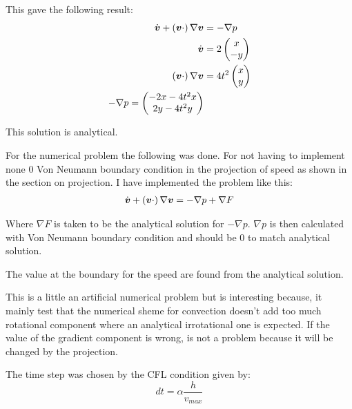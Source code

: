 This gave the following result:
\begin{align}
\dot{{\boldsymbol {v}}}+ \left({\boldsymbol {v}}\cdot\right) \nabla {\boldsymbol {v}}&=-\nabla p\\
\dot{{\boldsymbol {v}}}&=2\begin{pmatrix}
	               	x\\
	               	-y
	               \end{pmatrix}\\
\left({\boldsymbol {v}}\cdot\right) \nabla {\boldsymbol {v}}&=4t^2\begin{pmatrix}
                                                 	x\\
                                                 	y
                                                 \end{pmatrix}\\
-\nabla p=\begin{pmatrix}
           -2x-4t^2x\\
           2y-4t^2y
           \end{pmatrix}\\
\end{align}

This solution is analytical.

For the numerical problem the following was done.
For not having to implement none 0 Von Neumann boundary condition in the projection of speed as shown in the section on projection.
I have implemented the problem like this:
\begin{align}
	\dot{{\boldsymbol {v}}}+ \left({\boldsymbol {v}}\cdot\right) \nabla {\boldsymbol {v}}&=-\nabla p+\nabla F\\
\end{align}

Where $\nabla F$ is taken to be the analytical solution for $-\nabla p$.
$\nabla p$ is then calculated with Von Neumann boundary condition and should be 0 to match analytical solution.

The value at the boundary for the speed are found from the analytical solution.

This is a little an artificial numerical problem but is interesting because,
it mainly test that the numerical sheme for convection doesn't add too much rotational component
where an analytical irrotational one is expected. If the value of the gradient component is wrong, is not a problem
because it will be changed by the projection.

The time step was chosen by the CFL condition given by:
\begin{equation}
  dt=\alpha \frac{h}{v_{max}}
\end{equation}

